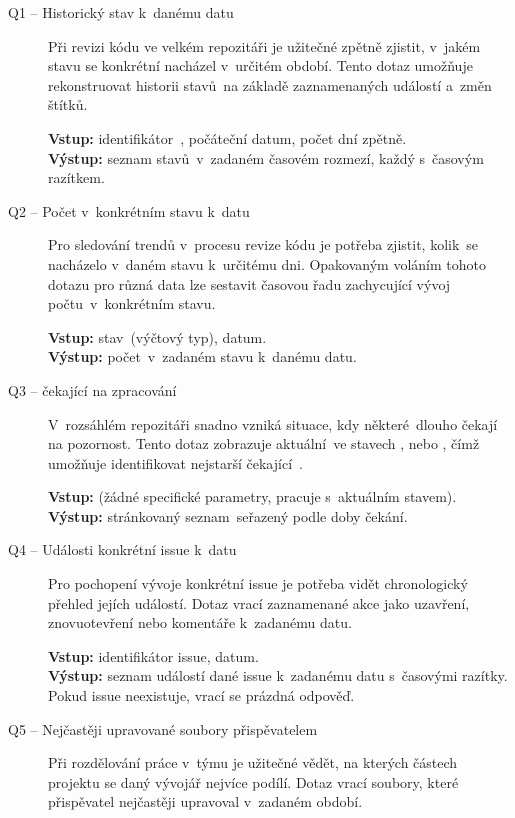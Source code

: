 \begin{description}
  \item[Q1 -- Historický stav \PR k~danému datu]
    Při revizi kódu ve velkém repozitáři je užitečné zpětně zjistit, v~jakém stavu se konkrétní \PR nacházel v~určitém období. Tento dotaz umožňuje rekonstruovat historii stavů~\PR na základě zaznamenaných událostí a~změn štítků.

    \textbf{Vstup:} identifikátor~\PR, počáteční datum, počet dní zpětně.\\
    \textbf{Výstup:} seznam stavů~\PR v~zadaném časovém rozmezí, každý s~časovým razítkem.

  \item[Q2 -- Počet \PR v~konkrétním stavu k~datu]
    Pro sledování trendů v~procesu revize kódu je potřeba zjistit, kolik~\PR se nacházelo v~daném stavu k~určitému dni. Opakovaným voláním tohoto dotazu pro různá data lze sestavit časovou řadu zachycující vývoj počtu~\PR v~konkrétním stavu.

    \textbf{Vstup:} stav~\PR (výčtový typ), datum.\\
    \textbf{Výstup:} počet~\PR v~zadaném stavu k~danému datu.

  \item[Q3 -- \PR čekající na zpracování]
    \label{item:query:q3}
    V~rozsáhlém repozitáři snadno vzniká situace, kdy některé~\PR dlouho čekají na pozornost. Tento dotaz zobrazuje aktuální~\PR ve stavech ,  nebo  , čímž umožňuje identifikovat nejstarší čekající~\PR.

    \textbf{Vstup:} (žádné specifické parametry, pracuje s~aktuálním stavem).\\
    \textbf{Výstup:} stránkovaný seznam~\PR seřazený podle doby čekání.

  \item[Q4 -- Události konkrétní issue k~datu]
    Pro pochopení vývoje konkrétní issue je potřeba vidět chronologický přehled jejích událostí. Dotaz vrací zaznamenané akce jako uzavření, znovuotevření nebo komentáře k~zadanému datu.

    \textbf{Vstup:} identifikátor issue, datum.\\
    \textbf{Výstup:} seznam událostí dané issue k~zadanému datu s~časovými razítky. Pokud issue neexistuje, vrací se prázdná odpověď.

  \item[Q5 -- Nejčastěji upravované soubory přispěvatelem]
    Při rozdělování práce v~týmu je užitečné vědět, na kterých částech projektu se daný vývojář nejvíce podílí. Dotaz vrací soubory, které přispěvatel nejčastěji upravoval v~zadaném období.


\end{description}
